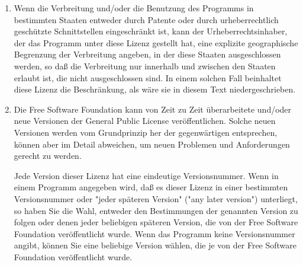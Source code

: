 {\begin{enumerate}
Sollte sich ein Teil dieses Paragraphen als ungültig oder unter bestimmten Umständen nicht durchsetzbar erweisen, so soll dieser Paragraph seinem Sinne nach angewandt werden; im übrigen soll dieser Paragraph als Ganzes gelten.

Zweck dieses Paragraphen ist nicht, Sie dazu zu bringen, irgendwelche Patente oder andere Eigentumsansprüche zu verletzen oder die Gültigkeit solcher Ansprüche zu bestreiten; dieser Paragraph hat einzig den Zweck, die Integrität des Verbreitungssystems der freien Software zu schützen, das durch die Praxis öffentlicher Lizenzen verwirklicht wird. Viele Leute haben großzügige Beiträge zu dem großen Angebot der mit diesem System verbreiteten Software im Vertrauen auf die konsistente Anwendung dieses Systems geleistet; es liegt am Autor/Geber, zu entscheiden, ob er die Software mittels irgendeines anderen Systems verbreiten will; ein Lizenznehmer hat auf diese Entscheidung keinen Einfluß.

Dieser Paragraph ist dazu gedacht, deutlich klarzustellen, was als Konsequenz aus dem Rest dieser Lizenz betrachtet wird.

\item Wenn die Verbreitung und/oder die Benutzung des Programms in bestimmten Staaten entweder durch Patente oder durch urheberrechtlich geschützte Schnittstellen eingeschränkt ist, kann der Urheberrechtsinhaber, der das Programm unter diese Lizenz gestellt hat, eine explizite geographische Begrenzung der Verbreitung angeben, in der diese Staaten ausgeschlossen werden, so daß die Verbreitung nur innerhalb und zwischen den Staaten erlaubt ist, die nicht ausgeschlossen sind. In einem solchen Fall beinhaltet diese Lizenz die Beschränkung, als wäre sie in diesem Text niedergeschrieben.

\item Die Free Software Foundation kann von Zeit zu Zeit überarbeitete und/oder neue Versionen der General Public License veröffentlichen. Solche neuen Versionen werden vom Grundprinzip her der gegenwärtigen entsprechen, können aber im Detail abweichen, um neuen Problemen und Anforderungen gerecht zu werden.

Jede Version dieser Lizenz hat eine eindeutige Versionsnummer. Wenn in einem Programm angegeben wird, daß es dieser Lizenz in einer bestimmten Versionsnummer oder "jeder späteren Version" ("any later version") unterliegt, so haben Sie die Wahl, entweder den Bestimmungen der genannten Version zu folgen oder denen jeder beliebigen späteren Version, die von der Free Software Foundation veröffentlicht wurde. Wenn das Programm keine Versionsnummer angibt, können Sie eine beliebige Version wählen, die je von der Free Software Foundation veröffentlicht wurde.


\end{enumerate}}
